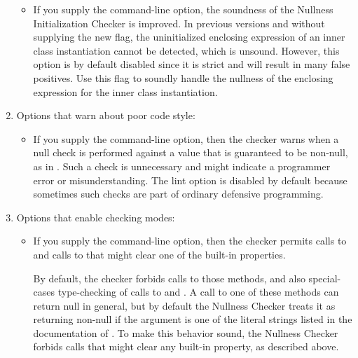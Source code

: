 \begin{enumerate}
\begin{itemize}
\item
  \label{nullness-AcheckEnclosingExpr}%
  If you supply the  command-line option, the soundness of
  the Nullness Initialization Checker is improved. In previous versions and without supplying the new flag,
  the uninitialized enclosing expression of an inner class instantiation cannot be detected, which is unsound.
  However, this option is by default disabled since it is strict and will result in many false positives.
  Use this flag to soundly handle the nullness of the enclosing expression for the inner class instantiation.
\end{itemize}

\item
  Options that warn about poor code style:

\begin{itemize}
\item
  \label{nullness-lint-nulltest}%
  If you supply the  command-line option, then the
  checker warns when a null check is performed against a value that is
  guaranteed to be non-null, as in .  Such a check is
  unnecessary and might indicate a programmer error or misunderstanding.
  The lint option is disabled by default because sometimes such checks are
  part of ordinary defensive programming.
\end{itemize}

\item
  Options that enable checking modes:

\begin{itemize}
\item
  If you supply the  command-line option,
  then the checker permits calls to
  and calls to
  that might clear one of the built-in properties.

  By default, the checker forbids calls to those methods, and also
  special-cases type-checking of calls to
  and
  .
  A call to one of these methods
  can return null in general, but by default the Nullness Checker treats it
  as returning non-null if the argument is one of the literal strings
  listed in the documentation of
  .
  To make this behavior sound, the Nullness Checker forbids calls that
  might clear any built-in property, as described above.


\end{itemize}
\end{enumerate}
